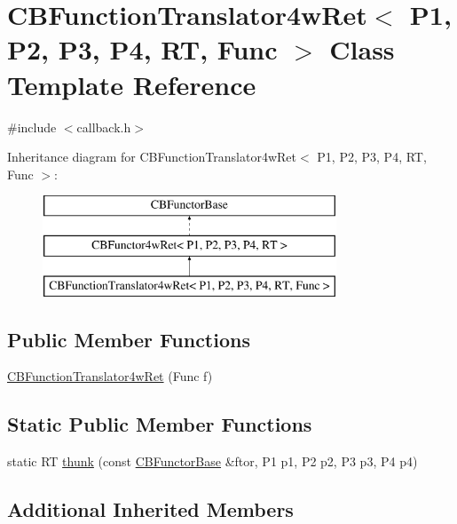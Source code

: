 \hypertarget{class_c_b_function_translator4w_ret}{\section{C\+B\+Function\+Translator4w\+Ret$<$ P1, P2, P3, P4, R\+T, Func $>$ Class Template Reference}
\label{class_c_b_function_translator4w_ret}
}


{\ttfamily \#include $<$callback.\+h$>$}

Inheritance diagram for C\+B\+Function\+Translator4w\+Ret$<$ P1, P2, P3, P4, R\+T, Func $>$\+:\begin{figure}[H]
\begin{center}
\leavevmode
\includegraphics[height=3.000000cm]{class_c_b_function_translator4w_ret}
\end{center}
\end{figure}
\subsection*{Public Member Functions}
\begin{DoxyCompactItemize}
\item 
\hyperlink{class_c_b_function_translator4w_ret_a9af730c577866db61c9d85d1449f6fae}{C\+B\+Function\+Translator4w\+Ret} (Func f)
\end{DoxyCompactItemize}
\subsection*{Static Public Member Functions}
\begin{DoxyCompactItemize}
\item 
static R\+T \hyperlink{class_c_b_function_translator4w_ret_a9f628525b525c0307d739c66f27bfd46}{thunk} (const \hyperlink{class_c_b_functor_base}{C\+B\+Functor\+Base} \&ftor, P1 p1, P2 p2, P3 p3, P4 p4)
\end{DoxyCompactItemize}
\subsection*{Additional Inherited Members}



